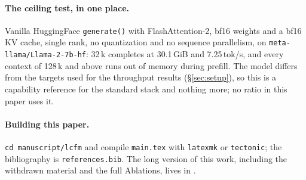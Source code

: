 \documentclass{article}
\begin{document}
\paragraph{The ceiling test, in one place.} Vanilla HuggingFace \texttt{generate()} with
FlashAttention-2, bf16 weights and a bf16 KV cache, single rank, no quantization and no
sequence parallelism, on \texttt{meta-llama/Llama-2-7b-hf}: 32\,k completes at 30.1\,GiB and
7.25\,tok/s, and every context of 128\,k and above runs out of memory during prefill. The
model differs from the targets used for the throughput results (\S\ref{sec:setup}), so this is
a capability reference for the standard stack and nothing more; no ratio in this paper uses
it.

\paragraph{Building this paper.} \texttt{cd manuscript/lcfm} and compile \texttt{main.tex} with
\texttt{latexmk} or \texttt{tectonic}; the bibliography is \texttt{references.bib}. The long
version of this work, including the withdrawn material and the full Ablations, lives in
.
\end{document}
